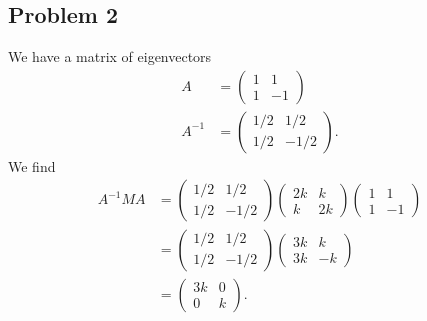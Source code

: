 \documentclass[10pt]{mypackage}
\begin{document}
\subsection{Problem 2}%
We have a matrix of eigenvectors
\begin{align*}
  A &= \begin{pmatrix}1 & 1 \\ 1 & -1\end{pmatrix}\\
  A^{-1} &= \begin{pmatrix}1/2 & 1/2 \\ 1/2 & -1/2\end{pmatrix}.
\end{align*}
We find
\begin{align*}
  A^{-1}MA &= \begin{pmatrix}1/2 & 1/2 \\ 1/2 & -1/2\end{pmatrix} \begin{pmatrix}2k & k \\ k & 2k\end{pmatrix} \begin{pmatrix}1 & 1 \\ 1 & -1\end{pmatrix}\\
           &= \begin{pmatrix}1/2 & 1/2 \\ 1/2 & -1/2\end{pmatrix} \begin{pmatrix}3k & k \\ 3k & -k\end{pmatrix}\\
           &= \begin{pmatrix}3k  & 0\\ 0 & k\end{pmatrix}.
\end{align*}
\end{document}
